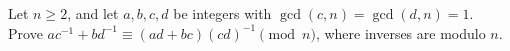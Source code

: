 Let $n\ge2$, and let $a,b,c,d$ be integers with $\gcd(c,n)=\gcd(d,n)=1$. Prove $ac^{-1}+bd^{-1}\equiv(ad+bc)(cd)^{-1}\pmod n$, where inverses are modulo $n$.
